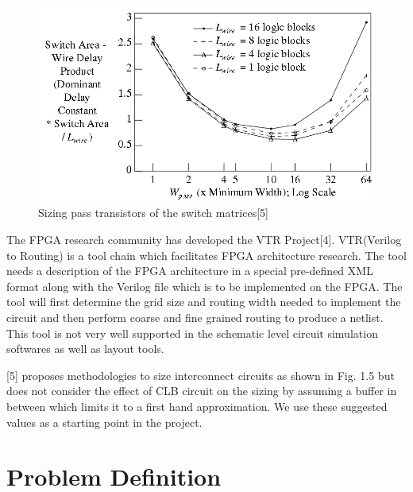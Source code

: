 \begin{figure}[h]
\centering
\includegraphics[width=0.9\linewidth]{previous_work.png}
\caption{Sizing pass transistors of the switch matrices[5]}
\label{fig:Figure}
\end{figure}

The FPGA research community has developed the VTR Project[4]. VTR(Verilog to Routing) is a tool chain which facilitates FPGA architecture research. The tool needs a description of the FPGA architecture in a special pre-defined XML format along with the Verilog file which is to be implemented on the FPGA. The tool will first determine the grid size and routing width needed to implement the circuit and then perform coarse and fine grained routing to produce a netlist. This tool is not very well supported in the schematic level circuit simulation softwares as well as layout tools. 

[5] proposes methodologies to size interconnect circuits as shown in Fig. 1.5 but does not consider the effect of CLB circuit on the sizing by assuming a buffer in between which limits it to a first hand approximation. We use these suggested values as a starting point in the project.

\section{Problem Definition}

\paragraph{}

